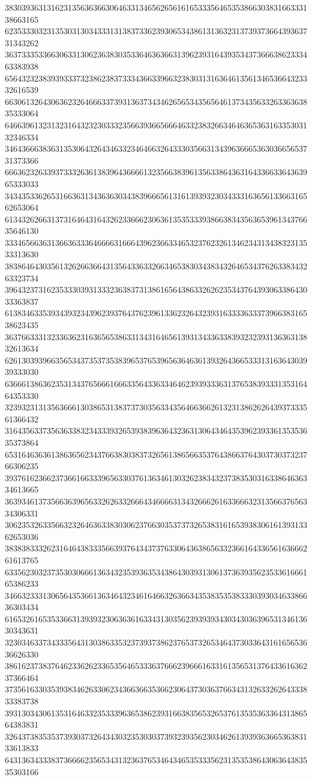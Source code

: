 38303936313162313563636630646331346562656161653335646535386630383166333138663165
62353330323135303130343331313837336239306534386131363231373937366439363731343262
36373335336630633130623638303533646363663139623931643935343736663862333463383938
65643232383939333732386238373334366339663238303131636461356134653664323332616539
66306132643063623264666337393136373434626565343565646137343563326336363835333064
64663961323132316432323033323566393665666463323832663464636536316335303132346334
34643666383631353064326434633234646632643330356631343963666536303665653731373366
66636232633937333263613839643666613235663839613563386436316433663364363965333033
34343533626531663631343636303438396665613161393932303433316365613366316562653064
61343262663137316464316432623366623063613535333938663834356365396134376635646130
33346566363136636333646666316664396236633465323762326134623431343832313533313630
38386464303561326266366431356433633266346538303438343264653437626338343263323734
39643237316235333039313332363837313861656438633262623534376439306338643033363837
61383463353934393234396239376437623961336232643239316333363337396638316538623435
36376633313233636231636565386331343164656139313433633839323239313636313832613634
62613039396635653437353735383965376539656364636139326436653331316364303939333030
63666138636235313437656661666335643363346462393933363137653839333135316464353330
32393231313563666130386531383737303563343564663662613231386262643937333561366432
31643563373563633832343339326539383963643236313064346435396239336135353635373864
65316463636138636562343766383038373265613865663537643866376430373037323766306235
39376162366237366166333965633037613634613032623834323738353031633864636334613665
36393461373566363965633262633266643466663134326662616336663231356637656334306331
30623532633566323264636338303062376630353737326538316165393830616139313362653036
38383833326231646438333566393764343737633064363865633236616433656163666261613765
63356230323735303066613634323539363534386430393130613736393562353361666165386233
34663233313065643536613634643234616466326366343538353538333039303463386636303434
61653261653533663139393230636361633431303562393939343034303639653134613630343631
32303463373433356431303863353237393738623765373265346437303364316165653636626330
38616237383764623362623365356465333637666239666163316135653137643361636237366464
37356163303539383462633062343663663536623064373036376634313263326264333833383738
39313034306135316463323533396365386239316638356532653761353536336431386564383831
32643738353537393037326434303235303037393239356230346261393936366536383133613833
64313634333837366662356534313236376534643465353335623135353864306364383535303166
